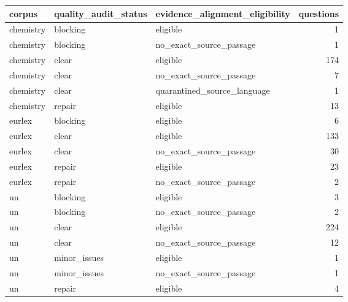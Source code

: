 \begin{tabular}{lllr}
\toprule
corpus & quality\_audit\_status & evidence\_alignment\_eligibility & questions \\
\midrule
chemistry & blocking & eligible & 1 \\
chemistry & blocking & no\_exact\_source\_passage & 1 \\
chemistry & clear & eligible & 174 \\
chemistry & clear & no\_exact\_source\_passage & 7 \\
chemistry & clear & quarantined\_source\_language & 1 \\
chemistry & repair & eligible & 13 \\
eurlex & blocking & eligible & 6 \\
eurlex & clear & eligible & 133 \\
eurlex & clear & no\_exact\_source\_passage & 30 \\
eurlex & repair & eligible & 23 \\
eurlex & repair & no\_exact\_source\_passage & 2 \\
un & blocking & eligible & 3 \\
un & blocking & no\_exact\_source\_passage & 2 \\
un & clear & eligible & 224 \\
un & clear & no\_exact\_source\_passage & 12 \\
un & minor\_issues & eligible & 1 \\
un & minor\_issues & no\_exact\_source\_passage & 1 \\
un & repair & eligible & 4 \\
\bottomrule
\end{tabular}
